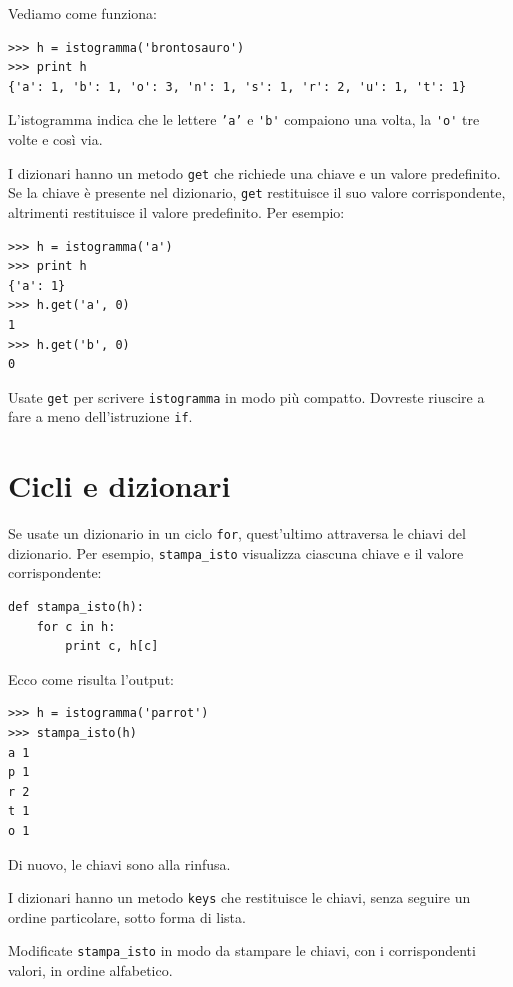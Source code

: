 \documentclass[10pt]{book}
\begin{document}
Vediamo come funziona:

\begin{verbatim}
>>> h = istogramma('brontosauro')
>>> print h
{'a': 1, 'b': 1, 'o': 3, 'n': 1, 's': 1, 'r': 2, 'u': 1, 't': 1}
\end{verbatim}
%
L'istogramma indica che le lettere {\tt 'a'} e \verb"'b'"
compaiono una volta, la \verb"'o'" tre volte e così via.

\vspace{0.2in}
\begin{exercise}

I dizionari hanno un metodo {\tt get} che richiede una chiave e un valore predefinito. Se la chiave è presente nel dizionario, {\tt get} restituisce il suo valore corrispondente, altrimenti restituisce il valore predefinito. Per esempio:

\begin{verbatim}
>>> h = istogramma('a')
>>> print h
{'a': 1}
>>> h.get('a', 0)
1
>>> h.get('b', 0)
0
\end{verbatim}
%
Usate {\tt get} per scrivere {\tt istogramma} in modo più compatto. Dovreste riuscire a fare a meno dell'istruzione {\tt if}.
\end{exercise}


\section{Cicli e dizionari}

Se usate un dizionario in un ciclo {\tt for}, quest'ultimo attraversa le chiavi del dizionario. Per esempio, \verb"stampa_isto" visualizza ciascuna chiave e il valore corrispondente:

\begin{verbatim}
def stampa_isto(h):
    for c in h:
        print c, h[c]
\end{verbatim}
%
Ecco come risulta l'output:

\begin{verbatim}
>>> h = istogramma('parrot')
>>> stampa_isto(h)
a 1
p 1
r 2
t 1
o 1
\end{verbatim}
%
Di nuovo, le chiavi sono alla rinfusa.

\vspace{0.2in}
\begin{exercise}

I dizionari hanno un metodo {\tt keys} che restituisce le chiavi, senza seguire un ordine particolare, sotto forma di lista.

Modificate \verb"stampa_isto" in modo da stampare le chiavi, con i corrispondenti valori, in ordine alfabetico.
\end{exercise}
\end{document}
